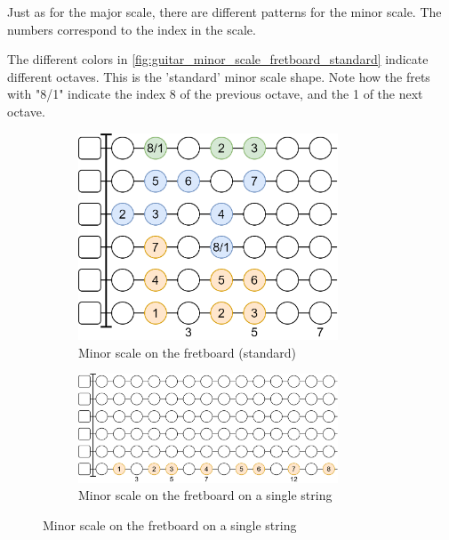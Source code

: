 \newpage

Just as for the major scale, there are different patterns for the minor scale.  The numbers correspond to the index in the scale.

The different colors in \autoref{fig:guitar_minor_scale_fretboard_standard} indicate different octaves. This is the 'standard' minor scale shape. Note how the frets with "8/1" indicate the index 8 of the previous octave, and the 1 of the next octave.

\begin{figure}[h]
	\begin{subfigure}[b]{0.45\textwidth}
		\centering
		\includegraphics[width=0.85\textwidth]{../../Images/guitar_minor_scale_standard.png}
		\caption{Minor scale on the fretboard (standard)}
		\label{fig:guitar_minor_scale_fretboard_standard}
	\end{subfigure}
	\hfill
	
	\vspace{0.5cm}
	\begin{subfigure}[b]{\textwidth}
		\centering
		\includegraphics[width=0.85\textwidth]{../../Images/guitar_minor_scale_single_string.png}
		\caption{Minor scale on the fretboard on a single string}
		\label{fig:guitar_minor_scale_fretboard_single_string}
	\end{subfigure}
	

\end{figure}
